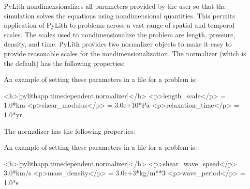PyLith nondimensionalizes all parameters provided by the user so that
the simulation solves the equations using nondimensional quantities.
This permits application of PyLith to problems across a vast range
of spatial and temporal scales. The scales used to nondimensionalize
the problem are length, pressure, density, and time. PyLith provides
two normalizer objects to make it easy to provide reasonable scales
for the nondimensionalization. The 
normalizer (which is the default) has the following properties:
\begin{inventory}
\end{inventory}
An example of setting these parameters in a  file for
a problem is:
\begin{cfg}
<h>[pylithapp.timedependent.normalizer]</h>
<p>length_scale</p> = 1.0*km
<p>shear_modulus</p> = 3.0e+10*Pa
<p>relaxation_time</p> = 1.0*yr
\end{cfg}
The  normalizer has the following
properties:
\begin{inventory}
\end{inventory}
An example of setting these parameters in a  file for
a problem is:
\begin{cfg}
<h>[pylithapp.timedependent.normalizer]</h>
<p>shear_wave_speed</p> = 3.0*km/s
<p>mass_density</p> = 3.0e+3*kg/m**3
<p>wave_period</p> = 1.0*s
\end{cfg}


